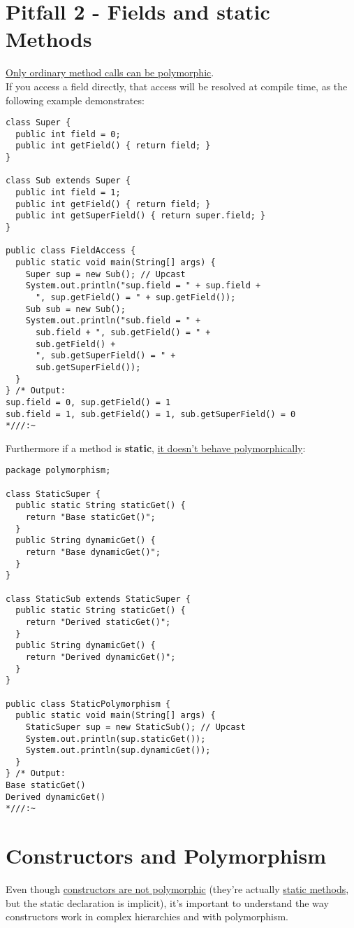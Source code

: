 \documentclass[10pt,letterpaper]{report}
\begin{document}
\section{Pitfall 2 - Fields and static Methods}
\underline{Only ordinary method calls can be polymorphic}.\\
If you access a field directly, that access will be resolved at compile time, as the following example demonstrates:
\begin{lstlisting}
class Super {
  public int field = 0;
  public int getField() { return field; }
}

class Sub extends Super {
  public int field = 1;
  public int getField() { return field; }
  public int getSuperField() { return super.field; }
}

public class FieldAccess {
  public static void main(String[] args) {
    Super sup = new Sub(); // Upcast
    System.out.println("sup.field = " + sup.field +
      ", sup.getField() = " + sup.getField());
    Sub sub = new Sub();
    System.out.println("sub.field = " +
      sub.field + ", sub.getField() = " +
      sub.getField() +
      ", sub.getSuperField() = " +
      sub.getSuperField());
  }
} /* Output:
sup.field = 0, sup.getField() = 1
sub.field = 1, sub.getField() = 1, sub.getSuperField() = 0
*///:~
\end{lstlisting}
Furthermore if a method is \textbf{static}, \underline{it doesn't behave polymorphically}:

\begin{lstlisting}
package polymorphism;

class StaticSuper {
  public static String staticGet() {
    return "Base staticGet()";
  }
  public String dynamicGet() {
    return "Base dynamicGet()";
  }
}

class StaticSub extends StaticSuper {
  public static String staticGet() {
    return "Derived staticGet()";
  }
  public String dynamicGet() {
    return "Derived dynamicGet()";
  }
}

public class StaticPolymorphism {
  public static void main(String[] args) {
    StaticSuper sup = new StaticSub(); // Upcast
    System.out.println(sup.staticGet());
    System.out.println(sup.dynamicGet());
  }
} /* Output:
Base staticGet()
Derived dynamicGet()
*///:~
\end{lstlisting}
\section{Constructors and Polymorphism}
Even though \underline{constructors are not polymorphic} (they're actually \underline{static methods}, but the static declaration is implicit), it's important to understand the way constructors work in complex hierarchies and with polymorphism.\\
\end{document}
